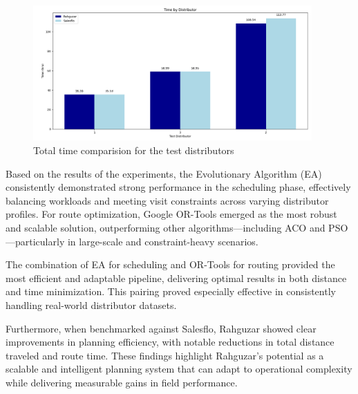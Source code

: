 \begin{figure}[H]
    \centering
    \includegraphics[width=0.95\textwidth]{images/time_rahgyzar_salesflo_comp}
    \caption{Total time comparision for the test distributors}
    \label{fig:results_time_comparision}
\end{figure}


Based on the results of the experiments, the Evolutionary Algorithm (EA) consistently demonstrated strong performance in the scheduling phase, effectively balancing workloads and meeting visit constraints across varying distributor profiles. For route optimization, Google OR-Tools emerged as the most robust and scalable solution, outperforming other algorithms—including ACO and PSO—particularly in large-scale and constraint-heavy scenarios.

The combination of EA for scheduling and OR-Tools for routing provided the most efficient and adaptable pipeline, delivering optimal results in both distance and time minimization. This pairing proved especially effective in consistently handling real-world distributor datasets.

Furthermore, when benchmarked against Salesflo, Rahguzar showed clear improvements in planning efficiency, with notable reductions in total distance traveled and route time. These findings highlight Rahguzar’s potential as a scalable and intelligent planning system that can adapt to operational complexity while delivering measurable gains in field performance.